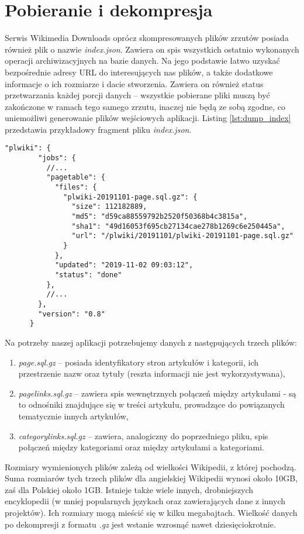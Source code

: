 \section{Pobieranie i dekompresja}
\label{sec:data-download}
Serwis Wikimedia Downloads oprócz skompresowanych plików zrzutów posiada również plik o nazwie \textit{index.json}. Zawiera on spis wszystkich ostatnio wykonanych operacji archiwizacyjnych na bazie danych. Na jego podstawie łatwo uzyskać bezpośrednie adresy URL do interesujących nas plików, a także dodatkowe informacje o ich rozmiarze i dacie stworzenia. Zawiera on również status przetwarzania każdej porcji danych – wszystkie pobierane pliki muszą być zakończone w ramach tego samego zrzutu, inaczej nie będą ze sobą zgodne, co uniemożliwi generowanie plików wejściowych aplikacji. Listing \ref{lst:dump_index} przedstawia przykładowy fragment pliku \textit{index.json}.

\begin{lstlisting}[frame=single,caption={Fragment informacji o ostatnim zrzucie bazy danych polskiej Wikipedii},label=lst:dump_index]
    "plwiki": {
        "jobs": {
          //...
          "pagetable": {
            "files": {
              "plwiki-20191101-page.sql.gz": {
                "size": 112182889,
                "md5": "d59ca88559792b2520f50368b4c3815a",
                "sha1": "49d16053f695cb27134cae278b1269c6e250445a",
                "url": "/plwiki/20191101/plwiki-20191101-page.sql.gz"
              }
            },
            "updated": "2019-11-02 09:03:12",
            "status": "done"
          },
          //...
        },
        "version": "0.8"
      }      
\end{lstlisting}

Na potrzeby naszej aplikacji potrzebujemy danych z następujących trzech plików:

\begin{enumerate}[label=\textbullet]
    \item \textit{page.sql.gz} – posiada identyfikatory stron artykułów i kategorii, ich przestrzenie nazw oraz tytuły (reszta informacji nie jest wykorzystywana),
    \item \textit{pagelinks.sql.gz} – zawiera spis wewnętrznych połączeń między artykułami - są to odnośniki znajdujące się w treści artykułu, prowadzące do powiązanych tematycznie innych artykułów,
    \item \textit{categorylinks.sql.gz} – zawiera, analogiczny do poprzedniego pliku, spis połączeń między kategoriami oraz między artykułami a kategoriami.
\end{enumerate}

Rozmiary wymienionych plików zależą od wielkości Wikipedii, z której pochodzą. Suma rozmiarów tych trzech plików dla angielskiej Wikipedii wynosi około 10GB, zaś dla Polskiej około 1GB. Istnieje także wiele innych, drobniejszych encyklopedii (w mniej popularnych językach oraz zawierających dane z innych projektów). Ich rozmiary mogą mieścić się w kilku megabajtach. Wielkość danych po dekompresji z formatu \textit{.gz} jest wstanie wzrosnąć nawet dziesięciokrotnie.
\newpage